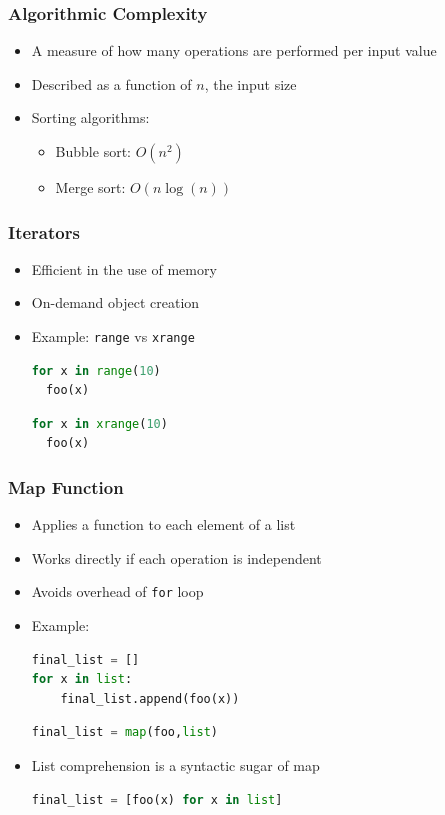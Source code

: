 \documentclass[xcolor=table,10pt,final]{beamer}
\begin{document}
\begin{frame}
	\frametitle{Algorithmic Complexity}
	\begin{itemize}
		\item A measure of how many operations are performed per input value
		\item Described as a function of $n$, the input size
		\item Sorting algorithms:
		\begin{itemize}
			\item Bubble sort: $O(n^2)$
			\item Merge sort: $O(n\log(n))$
		\end{itemize}
	\end{itemize}
\end{frame}

\begin{frame}[fragile]
	\frametitle{Iterators}
	\begin{itemize}
		\item Efficient in the use of memory
		\item On-demand object creation
		\item Example: {\tt range} vs {\tt xrange}
			\begin{lstlisting}[language=Python]
for x in range(10)
  foo(x)
			\end{lstlisting}
			\begin{lstlisting}[language=Python]
for x in xrange(10)
  foo(x)
			\end{lstlisting}
	\end{itemize}
\end{frame}

\begin{frame}[fragile]
	\frametitle{Map Function}
	\begin{itemize}
		\item Applies a function to each element of a list
		\item Works directly if each operation is independent
		\item Avoids overhead of {\tt for} loop
		\item Example:
			\begin{lstlisting}[language=Python]
final_list = []
for x in list:
    final_list.append(foo(x))
			\end{lstlisting}
			\begin{lstlisting}[language=Python]
final_list = map(foo,list)
			\end{lstlisting}
		\item List comprehension is a syntactic sugar of map
			\begin{lstlisting}[language=Python]
final_list = [foo(x) for x in list]
			\end{lstlisting}
	\end{itemize}
\end{frame}
\end{document}
